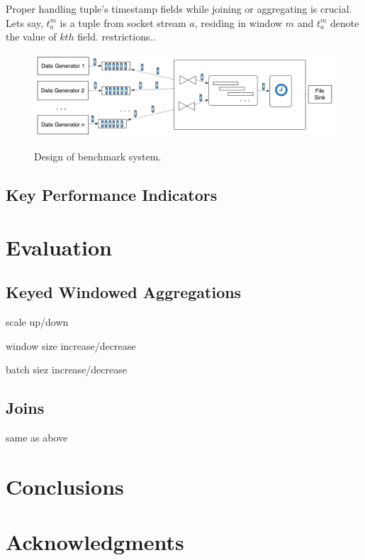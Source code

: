 \documentclass{vldb}
\begin{document}
Proper handling tuple's timestamp fields while joining or aggregating is crucial. Lets say, $t_{a}^{m}$ is a tuple from socket stream $a$, residing in window $m$ and $t_{a}^{m}$ denote the value of $k{th}$ field. 
restrictions..

\begin{figure}[h]
\caption{Design of benchmark system.}
\centering
\includegraphics[width=1\textwidth]{system_design}
\label{fig_design}
\end{figure}


\subsection{Key Performance Indicators}
\section{Evaluation}
\subsection{Keyed Windowed Aggregations}
scale up/down

window size increase/decrease

batch siez increase/decrease

\subsection{Joins}
same as above
\section{Conclusions}

\balance

\section{Acknowledgments}
\end{document}
